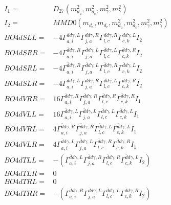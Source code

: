 \documentclass[A4,landscape]{article}
\begin{document}
\begin{align} 
I_1 = & D_{27}(m^2_{d_{{a}}}, m^2_{d_{{c}}}, m^2_{\gamma}, m^2_{\gamma}) \\ 
I_2 = & MMD0(m_{d_{{a}}}, m_{d_{{c}}}, m^2_{d_{{a}}}, m^2_{d_{{c}}}, m^2_{\gamma}, m^2_{\gamma}) \\ 
  BO4dSLL= & -4  \Gamma^{\bar{d}d \gamma ,L}_{a, i} \Gamma^{\bar{d}d \gamma ,R}_{j, a} \Gamma^{\bar{d}d \gamma ,R}_{l, c} \Gamma^{\bar{d}d \gamma ,L}_{c, k} I_2 \\ 
  BO4dSRR= & -4  \Gamma^{\bar{d}d \gamma ,R}_{a, i} \Gamma^{\bar{d}d \gamma ,L}_{j, a} \Gamma^{\bar{d}d \gamma ,L}_{l, c} \Gamma^{\bar{d}d \gamma ,R}_{c, k} I_2 \\ 
  BO4dSRL= & -4  \Gamma^{\bar{d}d \gamma ,R}_{a, i} \Gamma^{\bar{d}d \gamma ,L}_{j, a} \Gamma^{\bar{d}d \gamma ,R}_{l, c} \Gamma^{\bar{d}d \gamma ,L}_{c, k} I_2 \\ 
  BO4dSLR= & -4  \Gamma^{\bar{d}d \gamma ,L}_{a, i} \Gamma^{\bar{d}d \gamma ,R}_{j, a} \Gamma^{\bar{d}d \gamma ,L}_{l, c} \Gamma^{\bar{d}d \gamma ,R}_{c, k} I_2 \\ 
  BO4dVRR= & 16  \Gamma^{\bar{d}d \gamma ,R}_{a, i} \Gamma^{\bar{d}d \gamma ,R}_{j, a} \Gamma^{\bar{d}d \gamma ,R}_{l, c} \Gamma^{\bar{d}d \gamma ,R}_{c, k} I_1 \\ 
  BO4dVLL= & 16  \Gamma^{\bar{d}d \gamma ,L}_{a, i} \Gamma^{\bar{d}d \gamma ,L}_{j, a} \Gamma^{\bar{d}d \gamma ,L}_{l, c} \Gamma^{\bar{d}d \gamma ,L}_{c, k} I_1 \\ 
  BO4dVRL= & 4  \Gamma^{\bar{d}d \gamma ,R}_{a, i} \Gamma^{\bar{d}d \gamma ,R}_{j, a} \Gamma^{\bar{d}d \gamma ,L}_{l, c} \Gamma^{\bar{d}d \gamma ,L}_{c, k} I_1 \\ 
  BO4dVLR= & 4  \Gamma^{\bar{d}d \gamma ,L}_{a, i} \Gamma^{\bar{d}d \gamma ,L}_{j, a} \Gamma^{\bar{d}d \gamma ,R}_{l, c} \Gamma^{\bar{d}d \gamma ,R}_{c, k} I_1 \\ 
  BO4dTLL= & -( \Gamma^{\bar{d}d \gamma ,L}_{a, i} \Gamma^{\bar{d}d \gamma ,R}_{j, a} \Gamma^{\bar{d}d \gamma ,R}_{l, c} \Gamma^{\bar{d}d \gamma ,L}_{c, k} I_2) \\ 
  BO4dTLR= & 0 \\ 
  BO4dTRL= & 0 \\ 
  BO4dTRR= & -( \Gamma^{\bar{d}d \gamma ,R}_{a, i} \Gamma^{\bar{d}d \gamma ,L}_{j, a} \Gamma^{\bar{d}d \gamma ,L}_{l, c} \Gamma^{\bar{d}d \gamma ,R}_{c, k} I_2) \\ 
\end{align} 
\end{document}

